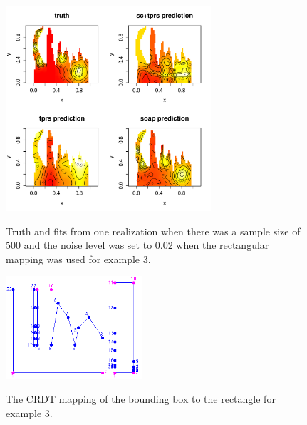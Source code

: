 \documentclass[a4paper,10pt]{amsart}
\begin{document}
\begin{figure}
\centering
\includegraphics[width=3in]{figs-otherdomains/wigglytop2-real.pdf} \\
\caption{Truth and fits from one realization when there was a sample size of 500 and the noise level was set to 0.02 when the rectangular mapping was used for example 3. }
\label{wigglytop2-real}
\end{figure}





\begin{figure}
\centering
\includegraphics[width=2in]{figs-otherdomains/wigglytop2-bbox-numbered.png} \\
\caption{The CRDT mapping of the bounding box to the rectangle for example 3.}
\label{wigglytop2-bbox-numbered}
\end{figure}
\end{document}

